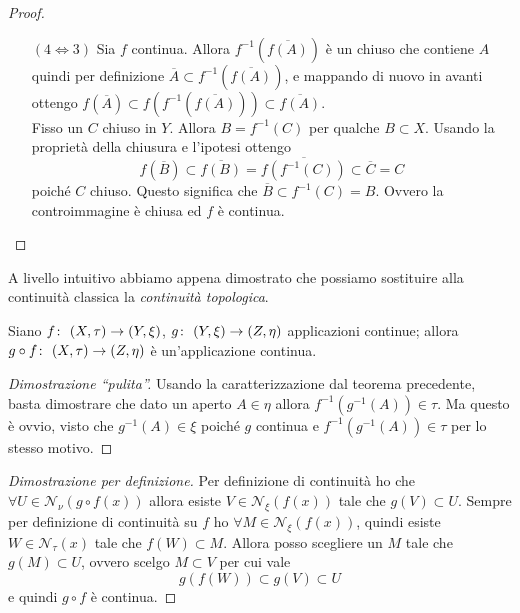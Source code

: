 \begin{proof}
\begin{enumerate}
\begin{equation*}
			f^{-1}(A^c) = f^{-1}(A)^c
		\end{equation*}
		allora se fisso un chiuso $C$, questo sarà uguale a $C = A^c$ dove $A$ aperto. Per cui $f^{-1}(C) = f^{-1}(A^c) = f^{-1}(A)^c$ e per ipotesi $f^{-1}(A)$ è aperto e per definizione il suo complementare dev'essere chiuso. Analogamente si dimostra se si fissa un aperto.
		\item[$(4 \Leftrightarrow 3)$] Sia $f$ continua. Allora $f^{-1}(\overline{f(A)})$ è un chiuso che contiene $A$ quindi per definizione $\overline{A} \subset f^{-1}(\overline{f(A)})$, e mappando di nuovo in avanti ottengo 
		$f(\overline{A}) \subset f(f^{-1}(\overline{f(A)})) 
		\subset \overline{f(A)}$.\\
		
		Fisso un $C$ chiuso in $Y$. Allora $B = f^{-1}(C)$ per qualche $B \subset X$. Usando la proprietà della chiusura e l'ipotesi ottengo  
		\begin{equation*}
			f(\overline{B}) \subset \overline{f(B)} = \overline{f(f^{-1}(C))} \subset \overline{C} = C
		\end{equation*}
		poiché $C$ chiuso. Questo significa che $\overline{B} \subset f^{-1}(C) = B$. Ovvero la controimmagine è chiusa ed $f$ è continua.
\end{enumerate}
\end{proof}
A livello intuitivo abbiamo appena dimostrato che possiamo sostituire alla continuità classica la \textit{continuità topologica}.
\begin{theorem}
	Siano $f \colon\ (X, \tau) \rightarrow (Y, \xi)$, $g \colon\ (Y,\xi) \rightarrow (Z, \eta)$ applicazioni continue; allora $g \circ f \colon\ (X,\tau) \rightarrow (Z,\eta)$ è un'applicazione continua.
\end{theorem}
\begin{proof}[Dimostrazione \enquote{pulita}]
	Usando la caratterizzazione dal teorema precedente, basta dimostrare che dato un aperto $A \in \eta$ allora $f^{-1}(g^{-1}(A)) \in \tau$. Ma questo è ovvio, visto che $g^{-1}(A) \in \xi$ poiché $g$ continua e $f^{-1}(g^{-1}(A)) \in \tau$ per lo stesso motivo.  
\end{proof}
\begin{proof}[Dimostrazione per definizione]
	Per definizione di continuità ho che $\forall U \in \mathcal{N}_\nu(g \circ f (x))$ allora esiste $V \in \mathcal{N}_\xi(f(x))$ tale che $g(V) \subset U$. Sempre per definizione di continuità su $f$ ho $\forall M \in \mathcal{N}_\xi(f (x))$, quindi esiste $W \in \mathcal{N}_\tau(x)$ tale che $f(W) \subset M$. Allora posso scegliere un $M$ tale che $g(M) \subset U$, ovvero scelgo $M \subset V$ per cui vale 
	\begin{equation*}
		g(f(W)) \subset g(V) \subset U
	\end{equation*}
	e quindi $g \circ f$ è continua.
\end{proof}



